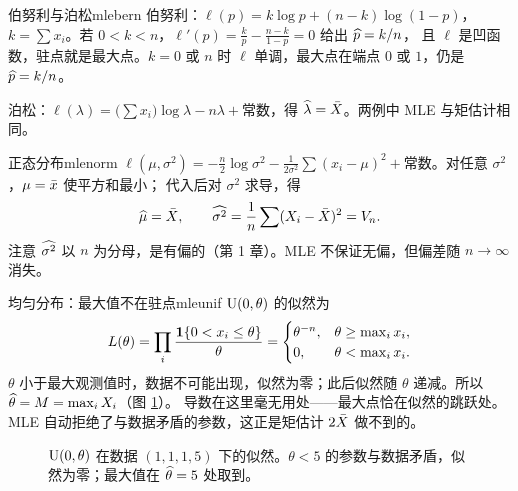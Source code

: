 \begin{example}{伯努利与泊松}{mlebern}
伯努利：$\ell(p)=k\log p+(n-k)\log(1-p)$，$k=\sum x_i$。若 $0<k<n$，$\ell'(p)=\frac kp-\frac{n-k}{1-p}=0$ 给出 $\widehat{p}=k/n$，
且 $\ell$ 是凹函数，驻点就是最大点。$k=0$ 或 $n$ 时 $\ell$ 单调，最大点在端点 $0$ 或 $1$，仍是 $\widehat{p}=k/n$。

泊松：$\ell(\lambda)=\big(\sum x_i\big)\log\lambda-n\lambda+\text{常数}$，得 $\widehat{\lambda}=\bar{X}$。两例中 MLE 与矩估计相同。
\end{example}

\begin{example}{正态分布}{mlenorm}
$\ell(\mu,\sigma^2)=-\frac n2\log\sigma^2-\frac{1}{2\sigma^2}\sum(x_i-\mu)^2+\text{常数}$。对任意 $\sigma^2$，$\mu=\bar{x}$ 使平方和最小；
代入后对 $\sigma^2$ 求导，得
\[
\widehat{\mu}=\bar{X},\qquad \widehat{\sigma^2}=\frac1n\sum(X_i-\bar{X})^2=V_n .
\]
注意 $\widehat{\sigma^2}$ 以 $n$ 为分母，是有偏的（第 1 章）。MLE 不保证无偏，但偏差随 $n\to\infty$ 消失。
\end{example}

\begin{example}{均匀分布：最大值不在驻点}{mleunif}
$\operatorname{U}(0,\theta)$ 的似然为
\[
L(\theta)=\prod_i\frac{\mathbf{1}\{0<x_i\le\theta\}}{\theta}=\begin{cases}\theta^{-n},&\theta\ge\max_ix_i,\\0,&\theta<\max_ix_i.\end{cases}
\]
$\theta$ 小于最大观测值时，数据不可能出现，似然为零；此后似然随 $\theta$ 递减。所以 $\widehat{\theta}=M=\max_iX_i$（图 \ref{fig:unifLik}）。
导数在这里毫无用处——最大点恰在似然的跳跃处。MLE 自动拒绝了与数据矛盾的参数，这正是矩估计 $2\bar{X}$ 做不到的。
\end{example}

\begin{figure}[H]
\centering
{}
\caption{$\operatorname{U}(0,\theta)$ 在数据 $(1,1,1,5)$ 下的似然。$\theta<5$ 的参数与数据矛盾，似然为零；最大值在 $\widehat{\theta}=5$ 处取到。}
\label{fig:unifLik}
\end{figure}

